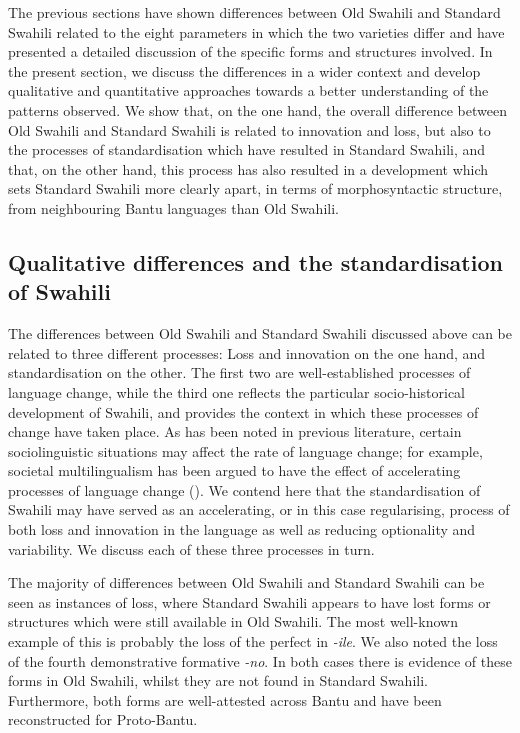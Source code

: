 \documentclass[output=paper]{langscibook}
\begin{document}
The previous sections have shown differences between Old Swahili and Standard Swahili related to the eight parameters in which the two varieties differ and have presented a detailed discussion of the specific forms and structures involved. In the present section, we discuss the differences in a wider context and develop qualitative and quantitative approaches towards a better understanding of the patterns observed. We show that, on the one hand, the overall difference between Old Swahili and Standard Swahili is related to innovation and loss, but also to the processes of standardisation which have resulted in Standard Swahili, and that, on the other hand, this process has also resulted in a development which sets Standard Swahili more clearly apart, in terms of morphosyntactic structure, from neighbouring Bantu languages than Old Swahili. 

\subsection{Qualitative differences and the standardisation of Swahili}\label{sec:marten:4.1}

The differences between Old Swahili and Standard Swahili discussed above can be related to three different processes: Loss and innovation on the one hand, and standardisation on the other. The first two are well-established processes of language change, while the third one reflects the particular socio-historical development of Swahili, and provides the context in which these processes of change have taken place. As has been noted in previous literature, certain sociolinguistic situations may affect the rate of language change; for example, societal multilingualism has been argued to have the effect of accelerating processes of language change (\citealt{Kusters2003, Trudgill2009, Trudgill2011, McWhorter2011}). We contend here that the standardisation of Swahili may have served as an accelerating, or in this case regularising, process of both loss and innovation in the language as well as reducing optionality and variability. We discuss each of these three processes in turn.

  The majority of differences between Old Swahili and Standard Swahili can be seen as instances of loss, where Standard Swahili appears to have lost forms or structures which were still available in Old Swahili. The most well-known example of this is probably the loss of the perfect in \textit{{}-ile}. We also noted the loss of the fourth demonstrative formative \textit{{}-no}. In both cases there is evidence of these forms in Old Swahili, whilst they are not found in Standard Swahili. Furthermore, both forms are well-attested across Bantu and have been reconstructed for Proto-Bantu. 
\end{document}
